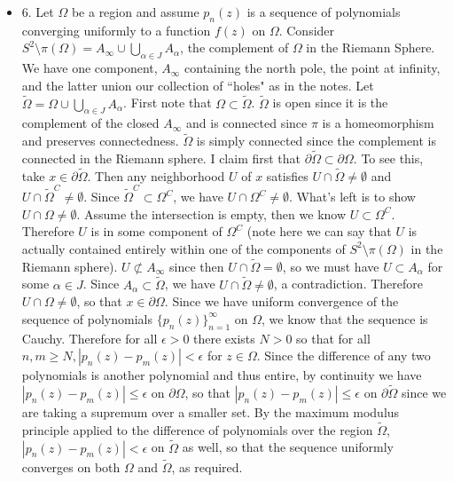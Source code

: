 \documentclass[11pt]{book}
\theoremstyle{definition}
\begin{document}
\begin{itemize}
\item 6. Let $\Omega$ be a region and assume $p_n(z)$ is a sequence of polynomials converging uniformly to a function $f(z)$ on $\Omega$. Consider $S^2\setminus \pi(\Omega)=A_{\infty}\cup \bigcup_{\alpha\in J}A_{\alpha}$, the complement of $\Omega$ in the Riemann Sphere. We have one component, $A_{\infty}$ containing the north pole, the point at infinity, and the latter union our collection of ``holes" as in the notes. Let $\tilde{\Omega}=\Omega\cup\bigcup_{\alpha\in J}A_{\alpha}$. First note that $\Omega\subset\tilde{\Omega}$. $\tilde{\Omega}$ is open since it is the complement of the closed $A_{\infty}$ and is connected since $\pi$ is a homeomorphism and preserves connectedness. $\tilde{\Omega}$ is simply connected since the complement is connected in the Riemann sphere. I claim first that $\partial \tilde{\Omega}\subset\partial\Omega$. To see this, take $x\in\partial\tilde{\Omega}$. Then any neighborhood $U$ of $x$ satisfies $U\cap \tilde{\Omega}\neq\emptyset$ and $U\cap \tilde{\Omega}^C\neq\emptyset$. Since $\tilde{\Omega}^C\subset\Omega^C$, we have $U\cap \Omega^C\neq\emptyset$. What's left is to show $U\cap \Omega\neq\emptyset$. Assume the intersection is empty, then we know $U\subset \Omega^C$. Therefore $U$ is in some component of $\Omega^C$ (note here we can say that $U$ is actually contained entirely within one of the components of $S^2\setminus\pi(\Omega)$ in the Riemann sphere). $U\not\subset A_{\infty}$ since then $U\cap\tilde{\Omega}=\emptyset$, so we must have $U\subset A_{\alpha}$ for some $\alpha\in J$. Since $A_{\alpha}\subset \tilde{\Omega}$, we have $U\cap \tilde{\Omega}\neq\emptyset$, a contradiction. Therefore $U\cap \Omega\neq\emptyset$, so that $x\in \partial\Omega$. Since we have uniform convergence of the sequence of polynomials $\{p_n(z)\}_{n=1}^\infty$ on $\Omega$, we know that the sequence is Cauchy. Therefore for all $\epsilon>0$ there exists $N>0$ so that for all $n,m\geq N, |p_n(z)-p_m(z)|<\epsilon$ for $z\in\Omega$. Since the difference of any two polynomials is another polynomial and thus entire, by continuity we have $|p_n(z)-p_m(z)|\leq \epsilon$ on $\partial \Omega$, so that $|p_n(z)-p_m(z)|\leq \epsilon$ on $\partial \tilde{\Omega}$ since we are taking a supremum over a smaller set. By the maximum modulus principle applied to the difference of polynomials over the region $\tilde{\Omega}$, $|p_n(z)-p_m(z)|<\epsilon$ on $\tilde{\Omega}$ as well, so that the sequence uniformly converges on both $\Omega$ and $\tilde{\Omega}$, as required.

\end{itemize}
\end{document}
